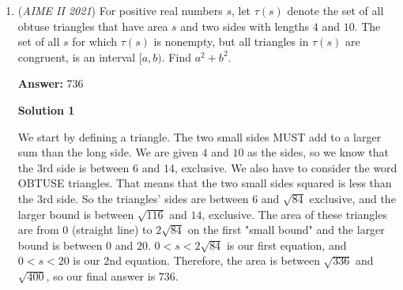 \begin{enumerate}
Since $m+i\sqrt{n}$ is a common root and all the coefficients are real, $m-i\sqrt{n}$ must be a common root, too.

 Now that we know all three roots of both polynomials, we can match coefficients (or more specifically, the zero coefficients).

 First, however, the product of the two common roots is:
 \begin{align*} &&&(x-m-i\sqrt{n})(x-m+i\sqrt{n})\\ &=&&x^2-x(m+i\sqrt{n}+m-i\sqrt{n})+(m+i\sqrt{n})(m-i\sqrt{n})\\ &=&&x^2-2xm+(m^2-i^2n)\\ &=&&x^2-2xm+m^2+n \end{align*}


 Now, let's equate the two forms of both the polynomials:
 \[x^3+ax+b=(x^2-2xm+m^2+n)(x+20)\]
 \[x^3+cx^2+d=(x^2-2xm+m^2+n)(x+21)\]Now we can match the zero coefficients.
 \[-2m+20=0\to m=10\text{ and}\]
 \[-42m+m^2+n=0\to-420+100+n=0\to n=320\text{.}\]Thus, $m+n=10+320=\boxed{330}$.

 


	\item (\textit{AIME II 2021}) For positive real numbers $s$, let $\tau(s)$ denote the set of all obtuse triangles that have area $s$ and two sides with lengths $4$ and $10$. The set of all $s$ for which $\tau(s)$ is nonempty, but all triangles in $\tau(s)$ are congruent, is an interval $[a,b)$. Find $a^2+b^2$.


 
 \textbf{Answer: }736



\textbf{Solution 1}

We start by defining a triangle. The two small sides MUST add to a larger sum than the long side. We are given $4$ and $10$ as the sides, so we know that the $3$rd side is between $6$ and $14$, exclusive. We also have to consider the word OBTUSE triangles. That means that the two small sides squared is less than the $3$rd side. So the triangles' sides are between $6$ and $\sqrt{84}$ exclusive, and the larger bound is between $\sqrt{116}$ and $14$, exclusive. The area of these triangles are from $0$ (straight line) to $2\sqrt{84}$ on the first "small bound" and the larger bound is between $0$ and $20$. $0 < s < 2\sqrt{84}$ is our first equation, and $0 < s < 20$ is our $2$nd equation. Therefore, the area is between $\sqrt{336}$ and $\sqrt{400}$, so our final answer is $\boxed{736}$.


\end{enumerate}
